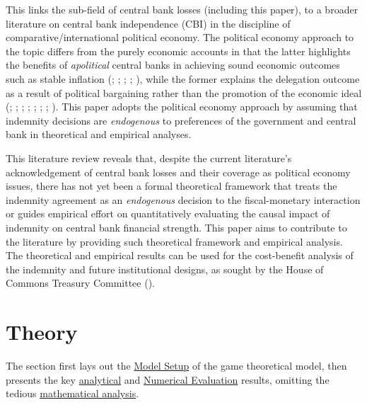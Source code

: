 \documentclass[
  a4paper,
  abstract=true]{scrartcl}
\theoremstyle{definition}
\begin{document}
This links the sub-field of central bank losses (including this paper),
to a broader literature on central bank independence (CBI) in the
discipline of comparative/international political economy. The political
economy approach to the topic differs from the purely economic accounts
in that the latter highlights the benefits of \emph{apolitical} central
banks in achieving sound economic outcomes such as stable inflation
(;
;
;
;
), while the former explains the
delegation outcome as a result of political bargaining rather than the
promotion of the economic ideal (; ;
;
;
;
;
;
). This paper adopts the
political economy approach by assuming that indemnity decisions are
\emph{endogenous} to preferences of the government and central bank in
theoretical and empirical analyses.

This literature review reveals that, despite the current literature's
acknowledgement of central bank losses and their coverage as political
economy issues, there has not yet been a formal theoretical framework
that treats the indemnity agreement as an \emph{endogenous} decision to
the fiscal-monetary interaction or guides empirical effort on
quantitatively evaluating the causal impact of indemnity on central bank
financial strength. This paper aims to contribute to the literature by
providing such theoretical framework and empirical analysis. The
theoretical and empirical results can be used for the cost-benefit
analysis of the indemnity and future institutional designs, as sought by
the House of Commons Treasury Committee ().

\section{Theory}\label{sec-theory}

The section first lays out the \hyperref[model-setup]{Model Setup} of
the game theoretical model, then presents the key
\hyperref[sec-analytical-main]{analytical} and
\hyperref[sec-simulation]{Numerical Evaluation} results, omitting the
tedious \hyperref[sec-model-app]{mathematical analysis}.
\end{document}
